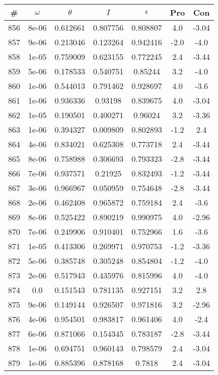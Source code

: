 \begin{table}
\begin{tabular}{c|c|c|c|c|c|c}
\# & $\omega$ & $\theta$ & $I$ & $\epsilon$ & Pro & Con\\
\hline
856 & 8e-06 & 0.612661 & 0.807756 & 0.808807 & 4.0 & -3.04\\
857 & 9e-06 & 0.213046 & 0.123264 & 0.942416 & -2.0 & -4.0\\
858 & 1e-05 & 0.759009 & 0.623155 & 0.772245 & 2.4 & -3.44\\
859 & 5e-06 & 0.178533 & 0.540751 & 0.85244 & 3.2 & -4.0\\
860 & 1e-06 & 0.544013 & 0.791462 & 0.928697 & 4.0 & -3.6\\
861 & 1e-06 & 0.936336 & 0.93198 & 0.839675 & 4.0 & -3.04\\
862 & 1e-05 & 0.190501 & 0.400271 & 0.96024 & 3.2 & -3.36\\
863 & 1e-06 & 0.394327 & 0.009809 & 0.802893 & -1.2 & 2.4\\
864 & 4e-06 & 0.834021 & 0.625308 & 0.773718 & 2.4 & -3.44\\
865 & 8e-06 & 0.758988 & 0.306693 & 0.793323 & -2.8 & -3.44\\
866 & 7e-06 & 0.937571 & 0.21925 & 0.832493 & -1.2 & -3.44\\
867 & 3e-06 & 0.966967 & 0.050959 & 0.754648 & -2.8 & -3.44\\
868 & 2e-06 & 0.462408 & 0.965872 & 0.759184 & 2.4 & -3.6\\
869 & 8e-06 & 0.525422 & 0.890219 & 0.990975 & 4.0 & -2.96\\
870 & 7e-06 & 0.249906 & 0.910401 & 0.752966 & 1.6 & -3.6\\
871 & 1e-05 & 0.413306 & 0.269971 & 0.970753 & -1.2 & -3.36\\
872 & 5e-06 & 0.385748 & 0.305248 & 0.854804 & -1.2 & -4.0\\
873 & 2e-06 & 0.517943 & 0.435976 & 0.815996 & 4.0 & -4.0\\
874 & 0.0 & 0.151543 & 0.781135 & 0.927151 & 3.2 & 2.8\\
875 & 9e-06 & 0.149144 & 0.926507 & 0.971816 & 3.2 & -2.96\\
876 & 4e-06 & 0.954501 & 0.983817 & 0.961406 & 4.0 & -2.4\\
877 & 6e-06 & 0.871066 & 0.154345 & 0.783187 & -2.8 & -3.44\\
878 & 1e-06 & 0.694751 & 0.960143 & 0.798579 & 2.4 & -3.04\\
879 & 1e-06 & 0.885396 & 0.878168 & 0.7818 & 2.4 & -3.04\\

\end{tabular}
\end{table}
